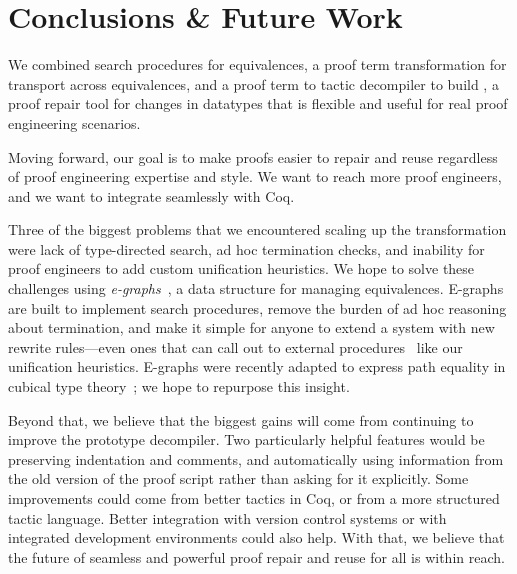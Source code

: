 \section{Conclusions \& Future Work}
\label{sec:discussion}

We combined search procedures for equivalences, a proof term transformation for transport across equivalences,
and a proof term to tactic decompiler to build \toolname,
a proof repair tool for changes in datatypes that is flexible and useful for real proof engineering scenarios.


Moving forward, our goal is to make proofs easier to repair and reuse regardless of proof engineering expertise and style.
We want to reach more proof engineers, and we want \toolname to integrate seamlessly with Coq.

Three of the biggest problems that we encountered scaling up the \toolname transformation were lack of type-directed search,
ad hoc termination checks, and inability for proof engineers to add custom unification heuristics.
We hope to solve these challenges using \textit{e-graphs}~\cite{egraph1},
a data structure %
for managing equivalences.
E-graphs are built to implement search procedures,
remove the burden of ad hoc reasoning about termination,
and make it simple for anyone to extend a system with new
rewrite rules---even ones that can call out to external procedures~\cite{egraph5} 
like our unification heuristics.
E-graphs were recently adapted to express path equality in cubical type theory~\cite{egraph6}; we hope to repurpose this insight.

Beyond that, we believe that the biggest gains will come from continuing to improve the prototype decompiler.
Two particularly helpful features would be preserving indentation and comments, and automatically using information from the old 
version of the proof script rather than asking for it explicitly.
Some improvements could come from better tactics in Coq,
or from a more structured tactic language.
Better integration with version control systems or with integrated development environments could also help.
With that, we believe that the future of seamless and powerful proof repair and reuse for all is within reach.


